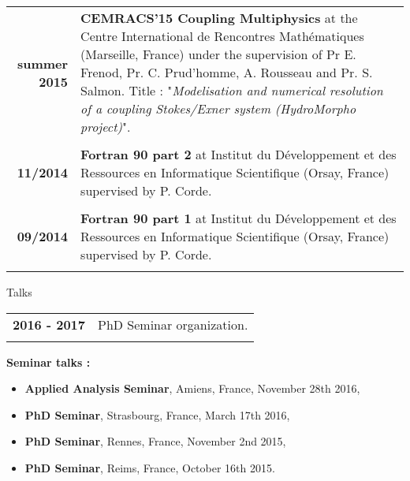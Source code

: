 \documentclass[10pt,a4paper]{report}
\begin{document}
\begin{center}
\begin{tabular}{r p{12cm}}
\textbf{summer 2015} & \textbf{CEMRACS'15 Coupling Multiphysics} at the Centre International de Rencontres Mathématiques (Marseille, France) under the supervision of Pr E. Frenod, Pr. C. Prud'homme, A. Rousseau and Pr. S. Salmon.\newline
Title : "\textit{Modelisation and numerical resolution of a coupling Stokes/Exner system (HydroMorpho project)}".\\

& \\

\textbf{11/2014} & \textbf{Fortran 90 part 2} at Institut du Développement et des Ressources en Informatique Scientifique (Orsay, France) supervised by P. Corde.\\

& \\

\textbf{09/2014} & \textbf{Fortran 90 part 1} at Institut du Développement et des Ressources en Informatique Scientifique (Orsay, France) supervised by P. Corde.\\

& \\

\end{tabular}
\end{center}


\vspace{1cm}
\noindent
{\selectfont
\begin{Large}
Talks
\end{Large}
\hrulefill
}

\vspace{0.6cm}
\noindent
\begin{center}
\begin{tabular}{r p{12cm}}
\textbf{2016 - 2017} & PhD Seminar organization.\\

& \\

\end{tabular}
\end{center}


\vspace{0.4cm}
\noindent
{\selectfont
\textbf{Seminar talks :}
}

\begin{itemize}
\item \textbf{Applied Analysis Seminar}, Amiens, France, November 28th 2016,
\item \textbf{PhD Seminar}, Strasbourg, France, March 17th 2016,
\item \textbf{PhD Seminar}, Rennes, France, November 2nd 2015,
\item \textbf{PhD Seminar}, Reims, France, October 16th 2015.
\end{itemize}
\end{document}
